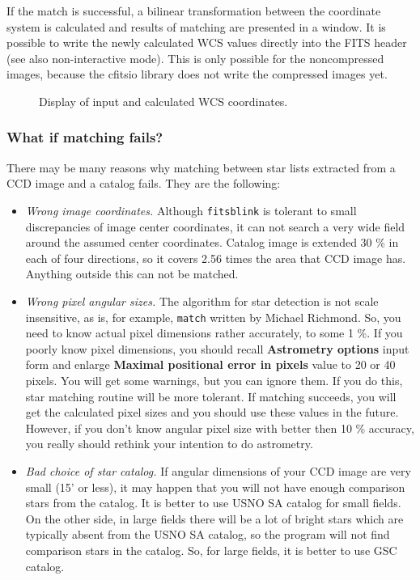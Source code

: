 \documentclass[11pt]{article}
\begin{document}
If the match is successful, a bilinear transformation between the
coordinate system is calculated and results of matching are presented
in a window.  It is possible to write the newly calculated WCS values
directly into the FITS header (see also non-interactive mode).  This
is only possible for the noncompressed images, because the cfitsio
library does not write the compressed images yet.

\begin{figure}
\begin{center}
\epsfxsize=8cm
\caption{Display of input and calculated WCS coordinates.}
\label{matched}
\end{center}
\end{figure}


\subsubsection{What if matching fails?}

There may be many reasons why matching between star lists extracted
from a CCD image and a catalog fails.  They are the following:

\begin{itemize}
\item \emph{Wrong image coordinates.}  Although \verb=fitsblink= is
tolerant to small discrepancies of image center coordinates, it can
not search a very wide field around the assumed center coordinates.
Catalog image is extended 30 \% in each of four directions, so it
covers 2.56 times the area that CCD image has.  Anything outside this
can not be matched.

\item \emph{Wrong pixel angular sizes.}  The algorithm for star
detection is not scale insensitive, as is, for example, \verb=match=
written by Michael Richmond.  So, you need to know actual pixel
dimensions rather accurately, to some 1 \%.  If you poorly know pixel
dimensions, you should recall \textbf{Astrometry options} input form
and enlarge \textbf{Maximal positional error in pixels} value to 20 or
40 pixels.  You will get some warnings, but you can ignore them.  If
you do this, star matching routine will be more tolerant.  If matching
succeeds, you will get the calculated pixel sizes and you should use
these values in the future.  However, if you don't know angular pixel
size with better then 10 \% accuracy, you really should rethink your
intention to do astrometry.

\item \emph{Bad choice of star catalog.}  If angular dimensions of
your CCD image are very small (15' or less), it may happen that you
will not have enough comparison stars from the catalog.  It is better
to use USNO SA catalog for small fields.  On the other side, in large
fields there will be a lot of bright stars which are typically absent
from the USNO SA catalog, so the program will not find comparison
stars in the catalog.  So, for large fields, it is better to use GSC
catalog.
\end{itemize}
\end{document}
